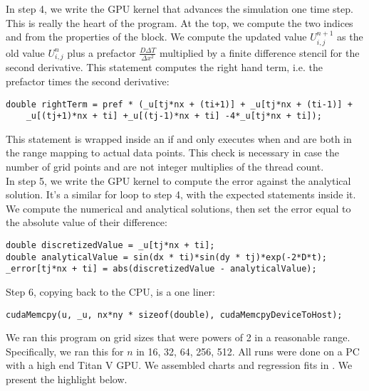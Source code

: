 In step 4, we write the GPU kernel that advances the simulation one time step.
This is really the heart of the program.  
At the top, we compute the two indices  and  from the properties of the block.
We compute the updated value $U_{i,j}^{n+1}$ as the old value $U_{i,j}^{n}$ plus a prefactor
$\frac{D\Delta T}{\Delta x^2}$ multiplied by a finite difference stencil for the second derivative.
This statement computes the right hand term, i.e. the prefactor times the second derivative:
\begin{lstlisting}[style=CodeSnippet]
double rightTerm = pref * (_u[tj*nx + (ti+1)] + _u[tj*nx + (ti-1)] +
	_u[(tj+1)*nx + ti] +_u[(tj-1)*nx + ti] -4*_u[tj*nx + ti]);
\end{lstlisting}
This statement is wrapped inside an if and only executes when  and  are both
in the range mapping to actual data points.  This check is necessary in case
the number of grid points  and  are not integer multiplies of the thread count. \\

In step 5, we write the GPU kernel to compute the error against the analytical solution.
It's a similar for loop to step 4, with the expected statements inside it.
We compute the numerical and analytical solutions, then set the error
equal to the absolute value of their difference:
\begin{lstlisting}[style=CodeSnippet]
double discretizedValue = _u[tj*nx + ti];
double analyticalValue = sin(dx * ti)*sin(dy * tj)*exp(-2*D*t);
_error[tj*nx + ti] = abs(discretizedValue - analyticalValue);
\end{lstlisting}
Step 6, copying back to the CPU, is a one liner:
\begin{lstlisting}[style=CodeSnippet]
cudaMemcpy(u, _u, nx*ny * sizeof(double), cudaMemcpyDeviceToHost);
\end{lstlisting}

We ran this program on grid sizes that were powers of 2 in a reasonable range.
Specifically, we ran this for $n$ in 16, 32, 64, 256, 512.
All runs were done on a PC with a high end Titan V GPU.
We assembled charts and regression fits in .
We present the highlight below.